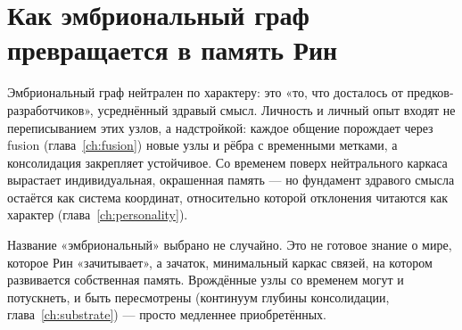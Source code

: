 \section{Как эмбриональный граф превращается в память Рин}

Эмбриональный граф нейтрален по характеру: это «то, что досталось от
предков-разработчиков», усреднённый здравый смысл. Личность и личный опыт входят не
переписыванием этих узлов, а надстройкой: каждое общение порождает через fusion
(глава~\ref{ch:fusion}) новые узлы и рёбра с временными метками, а консолидация
закрепляет устойчивое. Со временем поверх нейтрального каркаса вырастает
индивидуальная, окрашенная память — но фундамент здравого смысла остаётся как
система координат, относительно которой отклонения читаются как характер
(глава~\ref{ch:personality}).

\begin{intuition}
Название «эмбриональный» выбрано не случайно. Это не готовое знание о мире, которое
Рин «зачитывает», а зачаток, минимальный каркас связей, на котором развивается
собственная память. Врождённые узлы со временем могут и потускнеть, и быть
пересмотрены (континуум глубины консолидации, глава~\ref{ch:substrate}) — просто
медленнее приобретённых.
\end{intuition}
